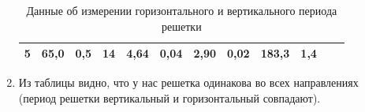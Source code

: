 \documentclass[a4paper, 12pt]{article}%
\begin{document}
\begin{enumerate}
\begin{table}[h!]
\begin{center}
\begin{tabular}{|c|c|c|c|c|c|c|c|c|c|c|c|}
5   & 65,0                                                      & 0,5                                                               & 14  & 4,64                                               & 0,04                                                       & 2,90                   & 0,02                         & 183,3                                               & 1,4                                                         &                                                    &                                                            \\ \hline
\end{tabular}
\caption{Данные об измерении горизонтального и вертикального периода решетки}
\end{center}
\end{table}
\item Из таблицы видно, что у нас решетка одинакова во всех направлениях (период решетки вертикальный и горизонтальный совпадают).
\end{enumerate}
\end{document}
